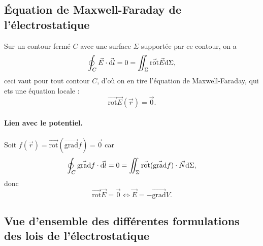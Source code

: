     \subsection{Équation de Maxwell-Faraday de l'électrostatique}

        Sur un contour fermé $C$ avec une surface $\Sigma$ supportée par ce contour, on a 
        \begin{equation}
            \oint_{C}\vec{E}\cdot\vec{\mathrm{d} l}=0=\iint_{\Sigma}\vec{\mathrm{rot}}\vec{E}\mathrm{d}\Sigma,
        \end{equation}
        ceci vaut pour tout contour $C$, d'où on en tire l'équation de Maxwell-Faraday, qui ets une équation locale :
        \begin{equation}
            \boxed{
                \vec{\mathrm{rot}}\vec{E}(\vec{r})=\vec{0}.
            }
        \end{equation}

        \paragraph{Lien avec le potentiel.}

            Soit $f(\vec{r})=\vec{\mathrm{rot}}(\vec{\mathrm{grad}}f)=\vec{0}$ car
            \begin{equation}
                \oint_{C}\vec{\mathrm{grad}}f\cdot\vec{\mathrm{d} l}=0=\iint_{\Sigma}\vec{\mathrm{rot}}(\vec{\mathrm{grad}}f)\cdot\vec{N}\mathrm{d}\Sigma,
            \end{equation}
            donc
            \begin{equation}
                \boxed{
                    \vec{\mathrm{rot}}\vec{E}=\vec{0}\Longleftrightarrow\vec{E}=-\vec{\mathrm{grad}}V.
                }
            \end{equation}

    \subsection{Vue d'ensemble des différentes formulations des lois de l'électrostatique}

